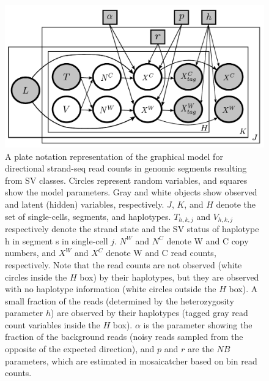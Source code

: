 \documentclass[12pt]{article}
\renewcommand{\j}{j} %
\newcommand{\X}{X} %
\renewcommand{\k}{k} %
\newcommand{\h}{h} %
\newcommand{\T}{T} %
\newcommand{\V}{V} %
\newcommand{\N}{N} %
\begin{document}
\begin{figure}
	\begin{center}
		\includegraphics[width=\textwidth]{graphical_model_v3_haplotagged-equal-sized-circle}
	\end{center}
\caption{A plate notation representation of the graphical model for directional strand-seq read counts in genomic segments resulting from SV classes. Circles represent random variables, and squares show the model parameters. Gray and white objects show observed and latent (hidden) variables, respectively. $J$, $K$, and $H$ denote the set of single-cells, segments, and haplotypes. $\T_{\h,\k,\j}$ and $\V_{\h,\k,\j}$ respectively denote the strand state and the SV status of haplotype h in segment s in single-cell $\j$. $\N^W$ and $\N^C$ denote W and C copy numbers, and $\X^W$ and $\X^C$ denote W and C read counts, respectively. Note that the read counts are not observed (white circles inside the $H$ box) by their haplotypes, but they are observed with no haplotype information (white circles outside the $H$ box). A small fraction of the reads (determined by the heterozygosity parameter $h$) are observed by their haplotypes (tagged gray read count variables inside the $H$ box). $\alpha$ is the parameter showing the fraction of the background reads (noisy reads sampled from the opposite of the expected direction), and $p$ and $r$ are the $NB$ parameters, which are estimated in mosaicatcher based on bin read counts.}
\end{figure}
\end{document}
